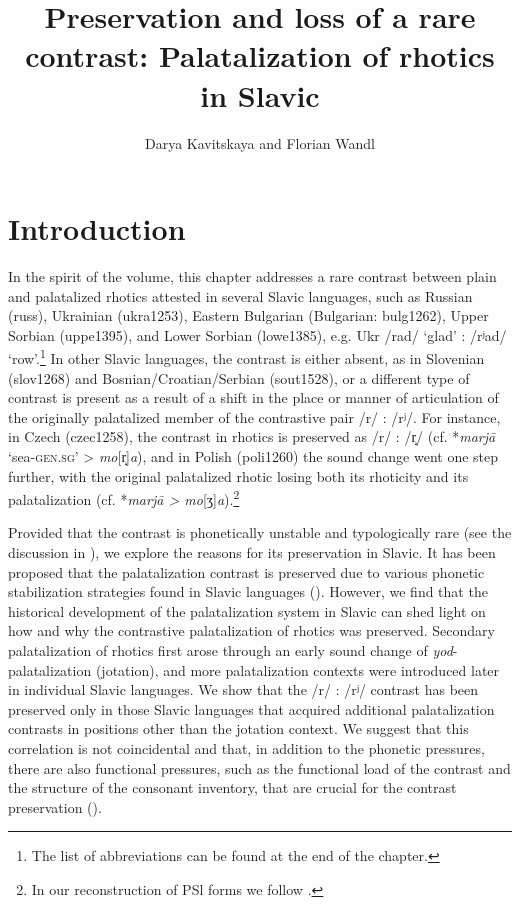 \documentclass[output=paper]{langscibook}
\author{Darya Kavitskaya\orcid{}\affiliation{University of California, Berkeley} and Florian Wandl\orcid{}\affiliation{University of Zurich} }
\title{Preservation and loss of a rare contrast: Palatalization of rhotics in Slavic}
\begin{document}
\maketitle 




\section{Introduction}
\label{sec:kavitskaya:1}
In the spirit of the volume, this chapter addresses a rare contrast between plain and palatalized rhotics attested in several Slavic languages, such as Russian (russ), Ukrainian (ukra1253), Eastern Bulgarian (Bulgarian: bulg1262), Upper Sorbian (uppe1395), and Lower Sorbian (lowe1385), e.g. Ukr /rad/ ‘glad’ : /rʲad/ ‘row’.\footnote{The list of abbreviations can be found at the end of the chapter.}  In other Slavic languages, the contrast is either absent, as in Slovenian (slov1268) and Bosnian/Croatian/Serbian (sout1528), or a different type of contrast is present as a result of a shift in the place or manner of articulation of the originally palatalized member of the contrastive pair /r/ : /rʲ/. For instance, in Czech (czec1258), the contrast in rhotics is preserved as /r/ : /r̝/ (cf. *\textit{marjā} ‘sea-\textsc{gen.sg}’ > \textit{mo}[r̝]\textit{a}), and in Polish (poli1260) the sound change went one step further, with the original palatalized rhotic losing both its rhoticity and its palatalization (cf. *\textit{marjā > mo}[ʒ]\textit{a}).\footnote{In our reconstruction of PSl forms we follow \citet{Holzer1995,Holzer2003}.}

Provided that the contrast is phonetically unstable and typologically rare (see the discussion in ), we explore the reasons for its preservation in Slavic. It has been proposed that the palatalization contrast is preserved due to various phonetic stabilization strategies found in Slavic languages (\citealt{IskarousKavitskaya2018}). However, we find that the historical development of the palatalization system in Slavic can shed light on how and why the contrastive palatalization of rhotics was preserved. Secondary palatalization of rhotics first arose through an early sound change of \textit{yod}-palatalization (jotation), and more palatalization contexts were introduced later in individual Slavic languages. We show that the /r/ : /rʲ/ contrast has been preserved only in those Slavic languages that acquired additional palatalization contrasts in positions other than the jotation context. We suggest that this correlation is not coincidental and that, in addition to the phonetic pressures, there are also functional pressures, such as the functional load of the contrast and the structure of the consonant inventory, that are crucial for the contrast preservation (\citealt{Martinet1952,Hockett1967,WedelEtAl2013b,WedelEtAl2013a}).
\end{document}
